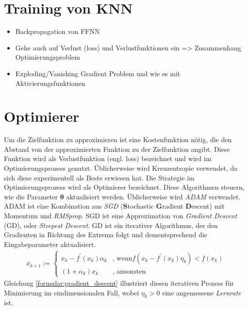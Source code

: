 \section{Training von KNN}
\begin{itemize}
    \item Backpropagation von FFNN
    \item Gehe auch auf Verlust (loss) und Verlustfunktionen ein => Zusammenhang Optimierungsproblem
    \item Exploding/Vanishing Gradient Problem und wie es mit Aktivierungsfunktionen
\end{itemize}

\section{Optimierer}
Um die Zielfunktion zu approximieren ist eine Kostenfunktion nötig, die den Abstand von der approximierten Funktion zu der Zielfunktion angibt.
Diese Funktion wird als Verlustfunktion (engl. loss) bezeichnet und wird im Optimierungsprozess genutzt.
Üblicherweise wird Kreuzentropie verwendet, da sich diese experimentell als Beste erwiesen hat.
\newline
\newline
Die Strategie im Optimierungsprozess wird als Optimierer bezeichnet.
Diese Algorithmen steuern, wie die Parameter $\boldsymbol\theta$ aktualisiert werden.
Üblicherweise wird \textit{ADAM} verwendet.
ADAM ist eine Kombination aus \textit{SGD} (\textbf{S}tochastic \textbf{G}radient \textbf{D}escent) mit Momentum und \textit{RMSprop}.
\newline
\newline
SGD ist eine Approximation von \textit{Gradient Descent} (GD), oder \textit{Steepest Descent}.
GD ist ein iterativer Algorithmus, der den Gradienten in Richtung des Extrema folgt und dementsprechend die Eingabeparameter aktualisiert.
\begin{align}
    \label{formular:gradient_descent}
    x_{k+1} := \begin{cases}
                   x_k - f^{\prime}(x_k)\alpha_k & \text{, wenn} f(x_k - f^{\prime}(x_k)\eta_k) < f(x_k)\\
                   (1 + \alpha_k)x_k & \text{, ansonsten}
    \end{cases}
\end{align}
Gleichung \ref{formular:gradient_descent} illustriert diesen iterativen Prozess für Minimierung im eindimensionalen Fall,
wobei $\eta_k > 0$ eine angemessene \textit{Lernrate} ist.
